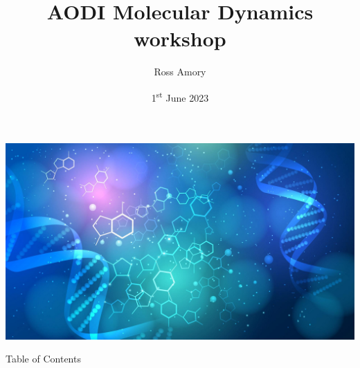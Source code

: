 

\title{AODI Molecular Dynamics workshop}
\author{Ross Amory}
\date[1\textsuperscript{st} June 2023]{1\textsuperscript{st} June 2023}



{
{\includegraphics[width=\paperwidth,height=\paperheight]{figures/title_background.jpg}}
\frame{\titlepage}
}



\begin{frame}{Table of Contents}
	\begin{multicols}{2}
		\tableofcontents
	\end{multicols}
\end{frame}








